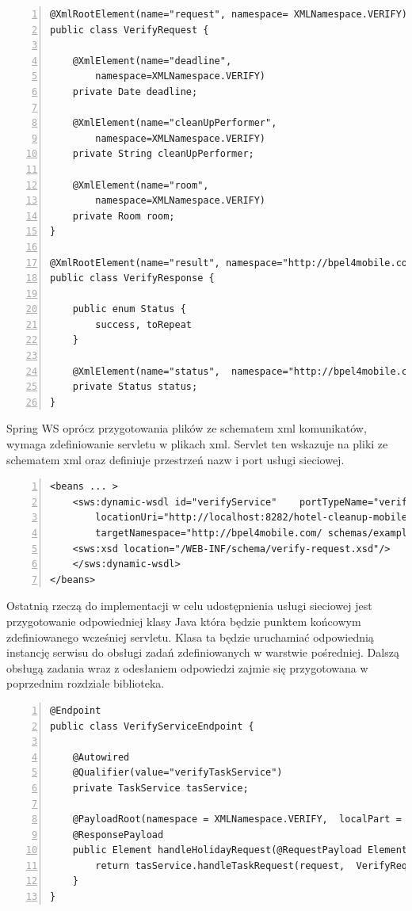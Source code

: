 \begin{lstlisting}[caption=Klasy zawierające komunikaty wejściowe i wyjściowe usługi weryfikacji sprzątania.,numbers=left]
@XmlRootElement(name="request", namespace= XMLNamespace.VERIFY)
public class VerifyRequest {

	@XmlElement(name="deadline",
		namespace=XMLNamespace.VERIFY)
	private Date deadline;

	@XmlElement(name="cleanUpPerformer", 
		namespace=XMLNamespace.VERIFY)
	private String cleanUpPerformer;

	@XmlElement(name="room", 
		namespace=XMLNamespace.VERIFY)
	private Room room;
}

@XmlRootElement(name="result", namespace="http://bpel4mobile.com/example/hotel/schemas")
public class VerifyResponse {

	public enum Status {
		success, toRepeat
	}

	@XmlElement(name="status",  namespace="http://bpel4mobile.com/example/hotel/schemas")
	private Status status;
}
\end{lstlisting}

Spring WS oprócz przygotowania plików ze schematem xml komunikatów, wymaga zdefiniowanie servletu w plikach xml. Servlet ten wskazuje na pliki ze schematem xml oraz definiuje przestrzeń nazw i port usługi sieciowej. 

\begin{lstlisting}[caption=Servlet usługi weryfikacji sprzątania.,numbers=left]
<beans ... >
	<sws:dynamic-wsdl id="verifyService"  	portTypeName="verifyServicePort" 
		locationUri="http://localhost:8282/hotel-cleanup-mobile-middleware/ws/verifyService" 
		targetNamespace="http://bpel4mobile.com/ schemas/example/verifyService"> 
	<sws:xsd location="/WEB-INF/schema/verify-request.xsd"/> 
	</sws:dynamic-wsdl>
</beans>
\end{lstlisting}

Ostatnią rzeczą do implementacji w celu udostępnienia usługi sieciowej jest przygotowanie odpowiedniej klasy Java która będzie punktem końcowym zdefiniowanego wcześniej servletu. Klasa ta będzie uruchamiać odpowiednią instancję serwisu do obsługi zadań zdefiniowanych w warstwie pośredniej. Dalszą obsługą zadania wraz z odesłaniem odpowiedzi zajmie się przygotowana w poprzednim rozdziale biblioteka. 

\begin{lstlisting}[caption=Punkt końcowy usługi weryfikacji sprzątania.,numbers=left]
@Endpoint
public class VerifyServiceEndpoint {

	@Autowired
	@Qualifier(value="verifyTaskService")
	private TaskService tasService;

	@PayloadRoot(namespace = XMLNamespace.VERIFY,  localPart = "VerifyTaskRequest") 
	@ResponsePayload
	public Element handleHolidayRequest(@RequestPayload Element request) throws Exception {
		return tasService.handleTaskRequest(request,  VerifyRequest.class,  VerifyResponse.class);
	}
}
\end{lstlisting}

